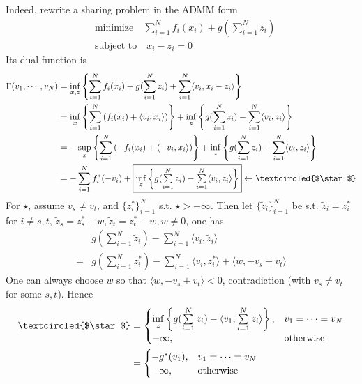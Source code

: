 Indeed, rewrite a sharing problem in the ADMM form
\begin{align*}
    & \text{minimize} \quad \sum\limits_{i=1}^N f_i(x_i) + g(\sum\limits_{i=1}^N z_i) \\
    & \text{subject to} \quad x_i - z_i = 0
\end{align*}
Its dual function is
\begin{align*}
    \Gamma(v_1,\cdots,v_N) & = \inf\limits_{x,z} \left\{ \sum\limits_{i=1}^N f_i(x_i) + g(\sum\limits_{i=1}^N z_i) + \sum\limits_{i=1}^N \langle v_i, x_i-z_i \rangle \right\} \\
    & = \inf\limits_{x} \left\{ \sum\limits_{i=1}^N \left( f_i(x_i) + \langle v_i, x_i \rangle \right) \right\} + \inf\limits_{z} \left\{ g(\sum\limits_{i=1}^N z_i) - \sum\limits_{i=1}^N \langle v_i, z_i \rangle \right\} \\
    & = -\sup\limits_{x} \left\{ \sum\limits_{i=1}^N \left( -f_i(x_i) + \langle -v_i, x_i \rangle \right) \right\} + \inf\limits_{z} \left\{ g(\sum\limits_{i=1}^N z_i) - \sum\limits_{i=1}^N \langle v_i, z_i \rangle \right\} \\
    & = -\sum\limits_{i=1}^N f_i^*(-v_i) + \framebox{$\inf\limits_{z} \left\{ g(\sum\limits_{i=1}^N z_i) - \sum\limits_{i=1}^N \langle v_i, z_i \rangle \right\}$} \leftarrow \textcircled{$\star$}
\end{align*}
For \textcircled{$\star$}, assume $v_s\neq v_t$, and $\{z_i^*\}_{i=1}^N$ s.t. \textcircled{$\star$}$>-\infty$. Then let $\{\widetilde{z}_i\}_{i=1}^N$ be s.t. $\widetilde{z}_i = z_i^*$ for $i\neq s,t$, $\widetilde{z}_s = z_s^* + w, \widetilde{z}_t = z_t^* - w, w\neq 0$, one has
\begin{align*}
    & g(\sum\limits_{i=1}^N \widetilde{z}_i) - \sum\limits_{i=1}^N \langle v_i, \widetilde{z}_i \rangle \\
    = & g(\sum\limits_{i=1}^N z_i^*) - \sum\limits_{i=1}^N \langle v_i, z_i^* \rangle + \langle w, -v_s+v_t \rangle
\end{align*}
One can always choose $w$ so that $\langle w, -v_s+v_t \rangle < 0$, contradiction (with $v_s\neq v_t$ for some $s, t$). Hence
\begin{align*}
    \textcircled{$\star$} & = \begin{cases}
    \inf\limits_{z} \left\{ g(\sum\limits_{i=1}^N z_i) - \langle v_1, \sum\limits_{i=1}^N z_i \rangle \right\}, & v_1 = \cdots = v_N \\
    -\infty, & \text{otherwise}
    \end{cases} \\
    & = \begin{cases}
    -g^*(v_1), & v_1 = \cdots = v_N \\
    -\infty, & \text{otherwise}
    \end{cases}
\end{align*}
